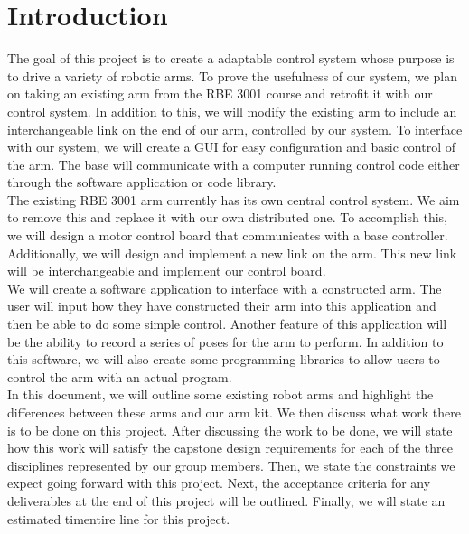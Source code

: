 \section{Introduction} 

The goal of this project is to create a adaptable control system whose purpose is to drive a variety of robotic arms. To prove the usefulness of our system, we plan on taking an existing arm from the RBE 3001 course and retrofit it with our control system.  In addition to this, we will modify the existing arm to include an interchangeable link on the end of our arm, controlled by our system. To interface with our system, we will create a GUI for easy configuration and basic control of the arm. The base will communicate with a computer running control code either through the software application or code library. \\
\newline
The existing RBE 3001 arm currently has its own central control system. We aim to remove this and replace it with our own distributed one. To accomplish this, we will design a motor control board that communicates with a base controller.  Additionally, we will design and implement a new link on the arm. This new link will be interchangeable and implement our control board. \\
\newline
We will create a software application to interface with a constructed arm. The user will input how they have constructed their arm into this application and then be able to do some simple control. Another feature of this application will be the ability to record a series of poses for the arm to perform. In addition to this software, we will also create some programming libraries to allow users to control the arm with an actual program. \\
\newline
In this document, we will outline some existing robot arms and highlight the differences between these arms and our arm kit. We then discuss what work there is to be done on this project. After discussing the work to be done, we will state how this work will satisfy the capstone design requirements for each of the three disciplines represented by our group members. Then, we state the constraints we expect going forward with this project. Next, the acceptance criteria for any deliverables at the end of this project will be outlined. Finally, we will state an estimated timentire line for this project.